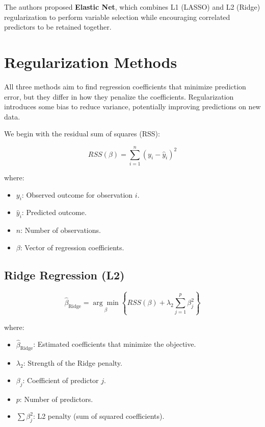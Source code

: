 \documentclass[
  letterpaper,
  DIV=11,
  numbers=noendperiod]{scrreprt}
\providecommand{\tightlist}{%
  \setlength{\itemsep}{0pt}\setlength{\parskip}{0pt}}
\begin{document}
The authors proposed \textbf{Elastic Net}, which combines L1 (LASSO) and
L2 (Ridge) regularization to perform variable selection while
encouraging correlated predictors to be retained together.

\section{Regularization Methods}\label{regularization-methods}

All three methods aim to find regression coefficients that minimize
prediction error, but they differ in how they penalize the coefficients.
Regularization introduces some bias to reduce variance, potentially
improving predictions on new data.

We begin with the residual sum of squares (RSS):

\[
RSS(\beta)=\sum_{i=1}^{n}(y_i-\hat{y}_i)^2
\]

where:

\begin{itemize}
\tightlist
\item
  \(y_i\): Observed outcome for observation \(i\).
\item
  \(\hat{y}_i\): Predicted outcome.
\item
  \(n\): Number of observations.
\item
  \(\beta\): Vector of regression coefficients.
\end{itemize}

\subsection{Ridge Regression (L2)}\label{ridge-regression-l2}

\[
\hat{\beta}_{\text{Ridge}}
=\underset{\beta}{\arg\min}
\left\{
RSS(\beta)+\lambda_2\sum_{j=1}^{p}\beta_j^2
\right\}
\]

where:

\begin{itemize}
\tightlist
\item
  \(\hat{\beta}_{\text{Ridge}}\): Estimated coefficients that minimize
  the objective.
\item
  \(\lambda_2\): Strength of the Ridge penalty.
\item
  \(\beta_j\): Coefficient of predictor \(j\).
\item
  \(p\): Number of predictors.
\item
  \(\sum\beta_j^2\): L2 penalty (sum of squared coefficients).
\end{itemize}
\end{document}

